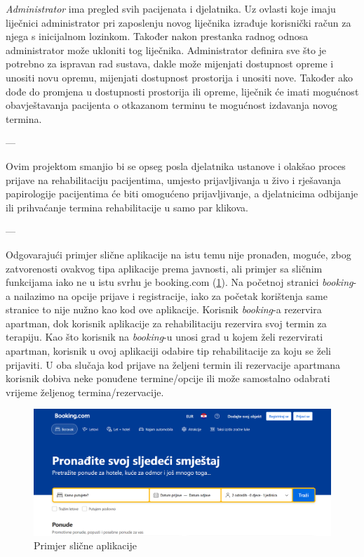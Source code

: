 		\textit{Administrator} ima pregled svih pacijenata i djelatnika. Uz ovlasti koje imaju liječnici administrator pri zaposlenju novog liječnika izrađuje korisnički račun za njega s inicijalnom lozinkom. Također nakon prestanka radnog odnosa administrator može ukloniti tog liječnika. Administrator definira sve što je potrebno za ispravan rad sustava, dakle može mijenjati dostupnost opreme i unositi novu opremu, mijenjati dostupnost prostorija i unositi nove. Također ako dođe do promjena u dostupnosti prostorija ili opreme, liječnik će imati mogućnost obavještavanja pacijenta o otkazanom terminu te mogućnost izdavanja novog termina.
		
		---
		
		Ovim projektom smanjio bi se opseg posla djelatnika ustanove i olakšao proces prijave na rehabilitaciju pacijentima, umjesto prijavljivanja u živo i rješavanja papirologije pacijentima će biti omogućeno prijavljivanje, a djelatnicima odbijanje ili prihvaćanje termina rehabilitacije u samo par klikova. 
		
		---
		
		Odgovarajući primjer slične aplikacije na istu temu nije pronađen, moguće, zbog zatvorenosti ovakvog tipa aplikacije prema javnosti, ali primjer sa sličnim funkcijama iako ne u istu svrhu je booking.com (\ref{fig:booking}). Na početnoj stranici \textit{booking}-a nailazimo na opcije prijave i registracije, iako za početak korištenja same stranice to nije nužno kao kod ove aplikacije. Korisnik \textit{booking}-a rezervira apartman, dok korisnik aplikacije za rehabilitaciju rezervira svoj termin za terapiju. Kao što korisnik na \textit{booking}-u unosi grad u kojem želi rezervirati apartman, korisnik u ovoj aplikaciji odabire tip rehabilitacije za koju se želi prijaviti. U oba slučaja kod prijave na željeni termin ili rezervacije apartmana korisnik dobiva neke ponuđene termine/opcije ili može samostalno odabrati vrijeme željenog termina/rezervacije. 
		
		\begin{figure}[H]
			\includegraphics[scale=0.4]{slike/slicna_aplikacija.PNG} %
			\centering
			\caption{Primjer slične aplikacije}
			\label{fig:booking}
		\end{figure}
		
